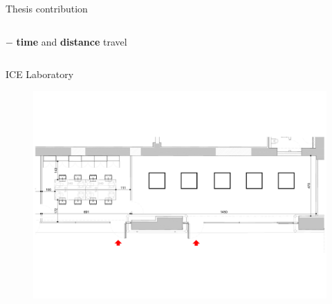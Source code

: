 \begin{frame}[fragile]{Thesis contribution}
\begin{columns}
\begin{column}{.4\textwidth}
                $-$ {\bf time} and {\bf distance} travel 
            \begin{figure}
                \qquad
            \end{figure}
            \end{column}
        \end{columns}
    \end{frame}


    \begin{frame}[fragile]{ICE Laboratory}
        \begin{figure}[hbt]
            \centering
            \includegraphics[width=\textwidth]{img/model1}
        \end{figure}
    \end{frame}

